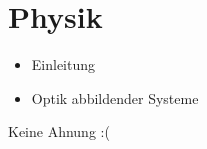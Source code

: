\section{Physik}
    \begin{itemize}
        \item{Einleitung}
        \item{Optik abbildender Systeme}
    \end{itemize}

    
    
    Keine Ahnung :(
\newpage
